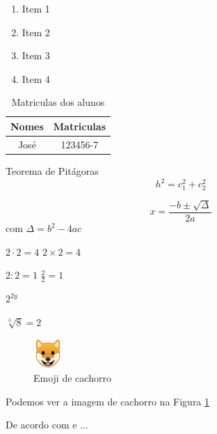 \begin{enumerate}
    \item Item 1
    \item Item 2
    \item Item 3
    \item Item 4
\end{enumerate}
\newpage

\begin{table}[hb]
    \centering
    \begin{tabular}{|c|c|}
        \hline
        Nomes & Matriculas \\
        \hline
        José & 123456-7 \\
        \hline
    \end{tabular}
    \caption{Matriculas dos alunos}
\end{table}

Teorema de Pitágoras
\begin{equation}
    h^2 = c_1^2 + c_2^2
\end{equation}

$$x = \frac{-b \pm \sqrt{\Delta}}{2a}$$
com $\Delta = b^2 - 4ac$

$2 \cdot 2 = 4$
$2 \times 2 = 4$

$2 : 2 = 1$
$\frac{2}{2} = 1$

$2^{2y}$

$\sqrt[3]{8}=2$

\begin{figure}[h]
    \centering
    \includegraphics[width=0.1\textwidth]{assets/dog.png}
    \caption{Emoji de cachorro}
    \label{ref_dog}
\end{figure}

\par Podemos ver a imagem de cachorro na Figura \ref{ref_dog}

De acordo com \cite{ibge1993} e \cite{abntex2-wiki-como-customizar}...


\nocite{abntex2cite}

\tableofcontents
\listoffigures
\listoftables

